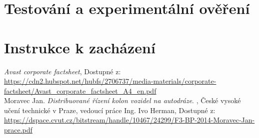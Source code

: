 \documentclass[thesis=M,czech,hidelinks]{FITthesis}[2013/05/06]
\begin{document}
\chapter{Testování a experimentální ověření}

\chapter{Instrukce k zacházení}


 \setlength{\parskip}{10pt}

\begin{conclusion}

\end{conclusion}



\begin{thebibliography}{9}

    \textit{Avast corporate factsheet}, Dostupné z: \\       \url{https://cdn2.hubspot.net/hubfs/2706737/media-materials/corporate-factsheet/Avast_corporate_factsheet_A4_en.pdf} \\
       	
       	Moravec Jan. \textit{Distribuované řízení kolon vozidel na autodráze}. , České vysoké učení technické v Praze, vedoucí práce Ing. Ivo Herman, Dostupné z: \\    \url{https://dspace.cvut.cz/bitstream/handle/10467/24299/F3-BP-2014-Moravec-Jan-prace.pdf} \\

\end{thebibliography}

\appendix

\end{document}
